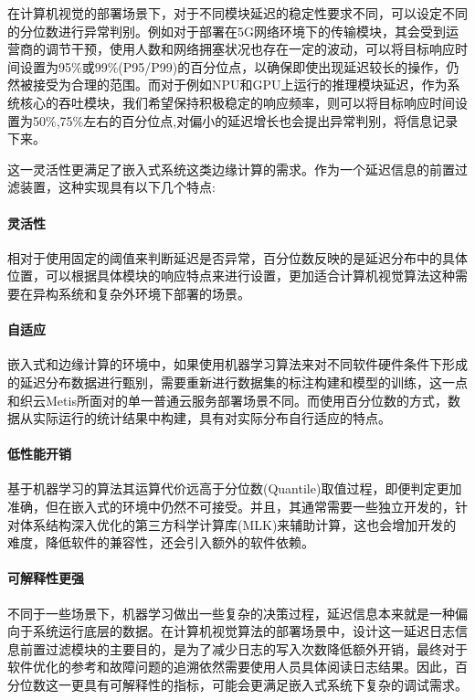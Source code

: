 \documentclass[master]{shtthesis}
\begin{document}
在计算机视觉的部署场景下，对于不同模块延迟的稳定性要求不同，可以设定不同的分位数进行异常判别。例如对于部署在5G网络环境下的传输模块，其会受到运营商的调节干预，使用人数和网络拥塞状况也存在一定的波动，可以将目标响应时间设置为95$\%$或99$\%$(P95/P99)的百分位点，以确保即使出现延迟较长的操作，仍然被接受为合理的范围。而对于例如NPU和GPU上运行的推理模块延迟，作为系统核心的吞吐模块，我们希望保持积极稳定的响应频率，则可以将目标响应时间设置为50$\%$,75$\%$左右的百分位点,对偏小的延迟增长也会提出异常判别，将信息记录下来。

这一灵活性更满足了嵌入式系统这类边缘计算的需求。作为一个延迟信息的前置过滤装置，这种实现具有以下几个特点:

\paragraph{灵活性}
相对于使用固定的阈值来判断延迟是否异常，百分位数反映的是延迟分布中的具体位置，可以根据具体模块的响应特点来进行设置，更加适合计算机视觉算法这种需要在异构系统和复杂外环境下部署的场景。

\paragraph{自适应}
嵌入式和边缘计算的环境中，如果使用机器学习算法来对不同软件硬件条件下形成的延迟分布数据进行甄别\cite{zhang2016treadmill}，需要重新进行数据集的标注构建和模型的训练，这一点和织云Metis所面对的单一普通云服务部署场景不同。而使用百分位数的方式，数据从实际运行的统计结果中构建，具有对实际分布自行适应的特点。

\paragraph{低性能开销}
基于机器学习的算法其运算代价远高于分位数(Quantile)取值过程，即便判定更加准确，但在嵌入式的环境中仍然不可接受。并且，其通常需要一些独立开发的，针对体系结构深入优化的第三方科学计算库(MLK)来辅助计算，这也会增加开发的难度，降低软件的兼容性，还会引入额外的软件依赖。

\paragraph{可解释性更强}
不同于一些场景下，机器学习做出一些复杂的决策过程，延迟信息本来就是一种偏向于系统运行底层的数据。在计算机视觉算法的部署场景中，设计这一延迟日志信息前置过滤模块的主要目的，是为了减少日志的写入次数降低额外开销，最终对于软件优化的参考和故障问题的追溯依然需要使用人员具体阅读日志结果。因此，百分位数这一更具有可解释性的指标，可能会更满足嵌入式系统下复杂的调试需求。
\end{document}
